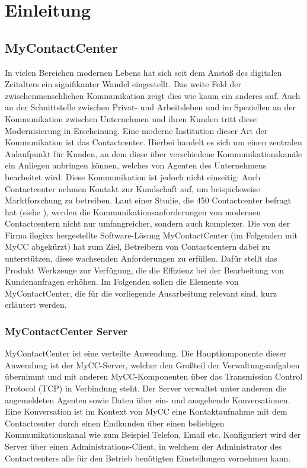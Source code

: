 \chapter{Einleitung}
\label{chap:Einleitung}

\section{MyContactCenter}
\label{sec:MyContactCenter}
In vielen Bereichen modernen Lebens hat sich seit dem Anstoß des digitalen Zeitalters ein signifikanter Wandel eingestellt. Das weite Feld  der zwischenmenschlichen Kommunikation zeigt dies wie kaum ein anderes auf. Auch an der Schnittstelle zwischen Privat- und Arbeitsleben und im Speziellen an der Kommunikation zwischen Unternehmen und ihren Kunden tritt diese Modernisierung in Erscheinung. Eine moderne Institution dieser Art der Kommunikation ist das Contactcenter. Hierbei handelt es sich um einen zentralen Anlaufpunkt für Kunden, an dem diese über verschiedene Kommunikationskanäle ein Anliegen anbringen können, welches von Agenten des Unternehmens bearbeitet wird. Diese Kommunikation ist jedoch nicht einseitig: Auch Contactcenter nehmen Kontakt zur Kundschaft auf, um beispielsweise Marktforschung zu betreiben. 
\newline
Laut einer Studie, die 450 Contactcenter befragt hat (siehe \cite{Deloitte:17}), werden die Kommunikationsanforderungen von modernen Contactcentern nicht nur umfangreicher, sondern auch komplexer. Die von der Firma ilogixx hergestellte Software-Lösung MyContactCenter (im Folgenden mit MyCC abgekürzt) hat zum Ziel, Betreibern von Contactcentern dabei zu unterstützen, diese wachsenden Anforderungen zu erfüllen. Dafür stellt das Produkt Werkzeuge zur Verfügung, die die Effizienz bei der Bearbeitung von Kundenanfragen erhöhen. Im Folgenden sollen die Elemente von MyContactCenter, die für die vorliegende Ausarbeitung relevant sind, kurz erläutert werden.

\subsection{MyContactCenter Server}
\label{subsec:MyContactCenterServer}
MyContactCenter ist eine verteilte Anwendung. Die Hauptkomponente dieser Anwendung ist der MyCC-Server, welcher den Großteil der Verwaltungsaufgaben übernimmt und mit anderen MyCC-Komponenten über das Transmission Control Protocol (TCP) in Verbindung steht. Der Server verwaltet unter anderem die angemeldeten Agenten sowie Daten über ein- und ausgehende Konversationen. Eine Konversation ist im Kontext von MyCC eine Kontaktaufnahme mit dem Contactcenter durch einen Endkunden über einen beliebigen Kommunikationskanal wie zum Beispiel Telefon, Email etc. Konfiguriert wird der Server über einen Administrations-Client, in welchem der Administrator des Contactcenters alle für den Betrieb benötigten Einstellungen vornehmen kann. 

